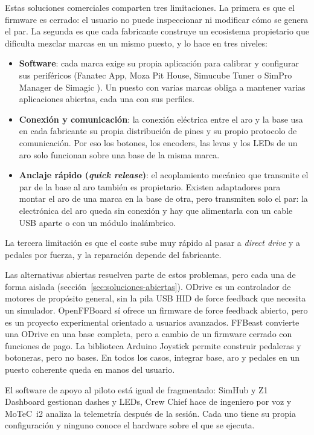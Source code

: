 Estas soluciones comerciales comparten tres limitaciones. La primera es que el firmware es cerrado: el usuario no puede inspeccionar ni modificar cómo se genera el par. La segunda es que cada fabricante construye un ecosistema propietario que dificulta mezclar marcas en un mismo puesto, y lo hace en tres niveles:
\begin{itemize}
	\item \textbf{Software}: cada marca exige su propia aplicación para calibrar y configurar sus periféricos (Fanatec App, Moza Pit House, Simucube Tuner o SimPro Manager de Simagic \parencite{fanatec_web, moza_web, simucube_web, simagic_web}). Un puesto con varias marcas obliga a mantener varias aplicaciones abiertas, cada una con sus perfiles.
	\item \textbf{Conexión y comunicación}: la conexión eléctrica entre el aro y la base usa en cada fabricante su propia distribución de pines y su propio protocolo de comunicación. Por eso los botones, los encoders, las levas y los LEDs de un aro solo funcionan sobre una base de la misma marca.
	\item \textbf{Anclaje rápido (\textit{quick release})}: el acoplamiento mecánico que transmite el par de la base al aro también es propietario. Existen adaptadores para montar el aro de una marca en la base de otra, pero transmiten solo el par: la electrónica del aro queda sin conexión y hay que alimentarla con un cable USB aparte o con un módulo inalámbrico.
\end{itemize}
La tercera limitación es que el coste sube muy rápido al pasar a \textit{direct drive} y a pedales por fuerza, y la reparación depende del fabricante.


Las alternativas abiertas resuelven parte de estos problemas, pero cada una de forma aislada (sección~\ref{sec:soluciones-abiertas}). ODrive es un controlador de motores de propósito general, sin la pila USB HID de force feedback que necesita un simulador. OpenFFBoard sí ofrece un firmware de force feedback abierto, pero es un proyecto experimental orientado a usuarios avanzados. FFBeast convierte una ODrive en una base completa, pero a cambio de un firmware cerrado con funciones de pago. La biblioteca Arduino Joystick permite construir pedaleras y botoneras, pero no bases. En todos los casos, integrar base, aro y pedales en un puesto coherente queda en manos del usuario.

El software de apoyo al piloto está igual de fragmentado: SimHub y Z1 Dashboard gestionan dashes y LEDs, Crew Chief hace de ingeniero por voz y MoTeC~i2 analiza la telemetría después de la sesión. Cada uno tiene su propia configuración y ninguno conoce el hardware sobre el que se ejecuta.

